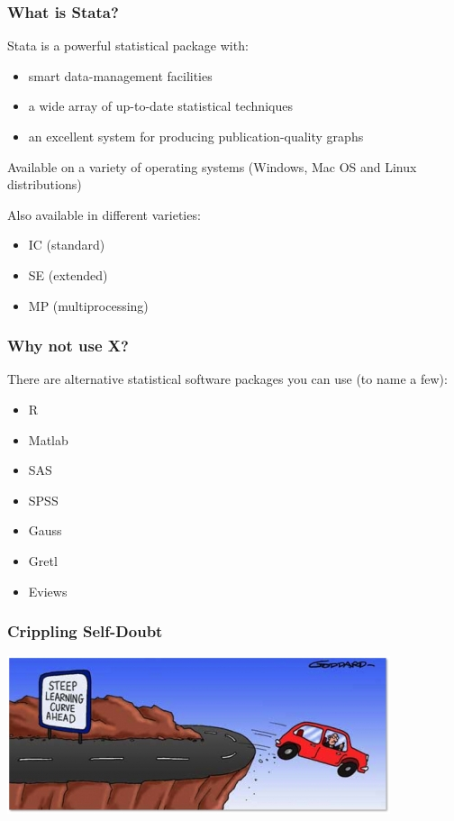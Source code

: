 \documentclass[10pt, compress]{beamer}
\begin{document}
\begin{frame}[fragile]
  \frametitle{What is Stata?}
  Stata is a powerful statistical package with:
  \begin{itemize}

   \item  smart data-management facilities
  
   \item  a wide array of up-to-date statistical techniques
  
   \item  an excellent system for producing publication-quality graphs
    
  \end{itemize}
  
  Available on a variety of operating systems (Windows, Mac OS and Linux distributions)
  
  Also available in different varieties:
  
    \begin{itemize}

   \item  IC (standard)
  
   \item SE (extended)
  
   \item  MP (multiprocessing)
    
  \end{itemize}
  
\end{frame}


\begin{frame}[fragile]
\frametitle{Why not use X?}
There are alternative statistical software packages you can use (to name a few):

\begin{itemize}
    \item R
    \item Matlab
    \item SAS
    \item SPSS
    \item Gauss
    \item Gretl
    \item Eviews
\end{itemize}

\end{frame}

\begin{frame}[fragile]
\frametitle{Crippling Self-Doubt}
\includegraphics[width=\linewidth,height=\textheight,keepaspectratio]{curve.png}

\end{frame}
\end{document}
